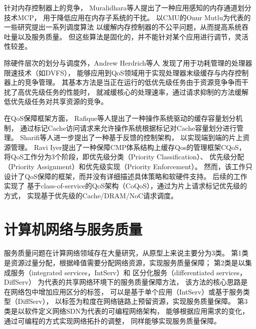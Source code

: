 
针对内存控制器上的竞争，
Muralidhara等人提出了一种应用感知的内存通道划分技术MCP\cite{muralidhara_reducing_2011}，
用于降低应用在内存子系统的干扰。
以CMU的Onur Mutlu为代表的一些研究提出一系列调度算法\cite{mutlu_stall-time_2007,
mutlu_parallelism-aware_2008, kim_atlas:_2010, kim_thread_2010}
以缓解内存控制器的不公平问题，从而提高系统吞吐量以及服务质量。
但这些算法是固化的，并不能针对某个应用进行调节，灵活性较差。

除硬件层次的划分与调度外，Andrew Herdrich等人\cite{herdrich_rate-based_2009}
发现了用于功耗管理的处理器限速技术（如DVFS），
能够应用到QoS领域用于实现处理器末级缓存与内存控制器上的竞争管理。
其基本方法是当正在运行的低优先级任务由于资源竞争争而干扰了高优先级任务的性能时，
就减缓核心的处理速率，通过请求抑制的方法缓解低优先级任务对共享资源的竞争。

在QoS保障框架方面，
Rafique等人提出了一种操作系统驱动的缓存容量划分机制\cite{Rafique:2006:ASO}，
通过标记Cache访问请求来允许操作系统根据标记对Cache容量划分进行管理。
Sharifi等人进一步提出了一种基于反馈的控制架构\cite{sharifi_mete:_2011}，
以实现端到端的片上资源管理。
Ravi Iyer提出了一种保障CMP体系结构上缓存Qos的管理框架CQoS\cite{iyer_cqos:_2004}，
将QoS工作分为3个阶段，即优先级分类（Priority Classification）、
优先级分配（Priority Assignment）和优先级实现（Priority Enforcement）。
然而，该工作只设计了QoS保障的框架，而并没有详细描述具体策略和软硬件支持。
后续的工作\cite{iyer_qos_2007, li_coqos:_2011, li_dynamic_2012}实现了
基于class-of-service的QoS架构（CoQoS），通过为片上请求标记优先级的方式，
实现基于优先级的Cache/DRAM/NoC请求调度。


\section{计算机网络与服务质量}
\label{sec:background:sdn}

服务质量问题在计算网络领域存在大量研究，从原型上来说主要分为3类。
第1类是资源过量分配，根据峰值需要分配网络资源，实现服务质量保障；
第2类是以集成服务（integrated services，IntServ）\cite{IntServ}和
区分化服务（differentiated services，DiffServ）\cite{DiffServ}
为代表的共享网络环境下的服务质量保障方法，
该方法的核心思路是在网络包中增加应用区分的标签，
可以是基于单个应用（IntServ）或基于服务类型（DiffServ），
以标签为粒度在网络链路上预留资源，实现服务质量保障。
第3类是以软件定义网络SDN\cite{SDN}为代表的可编程网络架构，
能够根据应用需求的变化，通过可编程的方式实现网络拓扑的调整，
同样能够实现服务质量保障。

